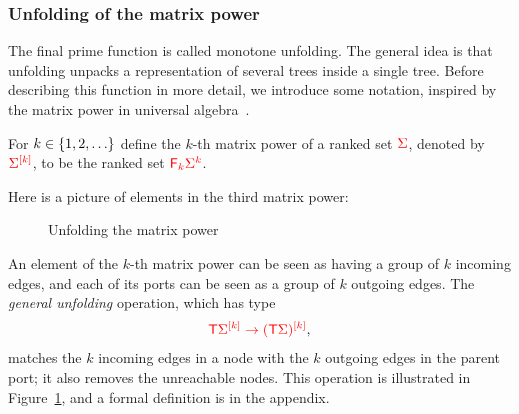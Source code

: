 \subsubsection{Unfolding of the matrix power}
\label{sec:unfolding}
The final  prime function is called monotone unfolding. The general idea is that unfolding unpacks a representation of several trees inside a single tree.  Before describing this function in more detail,  we introduce some notation,  inspired by the matrix power in  universal algebra~\citep[p.~268]{Taylor1975}. 
\begin{definition}
     For $k \in \set{1,2,\ldots}$ define the $k$-th matrix power of a ranked set $\rSigma$, denoted by $\mati k \rSigma$, to be the ranked set $\reduce k \powersmall \rSigma k$.
\end{definition}
Here is a picture of elements in the third matrix power:


\begin{figure}[]
    \caption{Unfolding the matrix power}
    \label{fig:unfold}
\end{figure}

An element of the $k$-th matrix power  can be seen as having a group of $k$ incoming edges, and each of its ports  can be seen as a group of $k$ outgoing edges. The \emph{general unfolding} operation, which has type
\begin{align*}
    \ranked{\tmonad \mati k{\Sigma} \to \mati k{( \tmonad \Sigma)}},
\end{align*}
matches the $k$ incoming edges in a node with the $k$ outgoing edges in the parent port; it also removes the unreachable nodes. This operation is illustrated in Figure~\ref{fig:unfold}, and  a formal definition  is  in the appendix.





